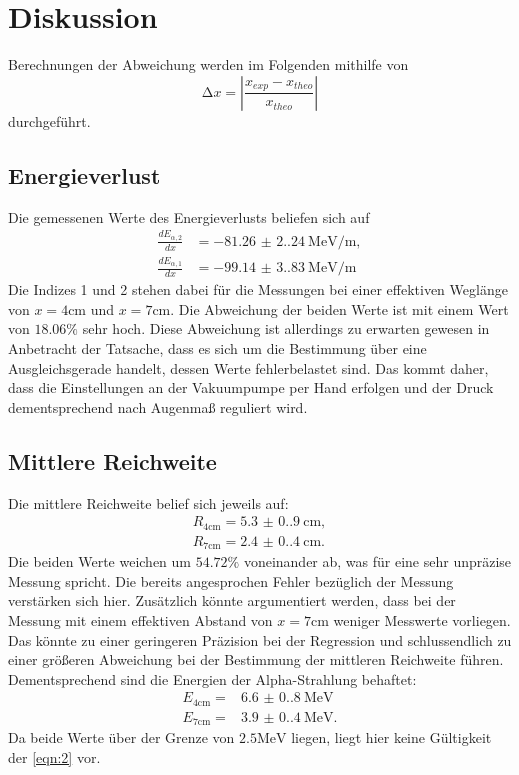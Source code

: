 \section{Diskussion}
\label{sec:Diskussion}

Berechnungen der Abweichung werden im Folgenden mithilfe von 
\begin{equation*}
    \increment x = \left| \frac{x_{exp}-x_{theo}}{x_{theo}} \right|
\end{equation*}
durchgeführt.

\subsection{Energieverlust}
Die gemessenen Werte des Energieverlusts beliefen sich auf 
\begin{align*}
    \frac{dE_{\alpha,2}}{dx} &= \qty{-81.26(2.24)}{\mega\electronvolt\per\meter}, \\
    \frac{dE_{\alpha,1}}{dx} &= \qty{-99.14(3.83)}{\mega\electronvolt\per\meter}
\end{align*}
Die Indizes 1 und 2 stehen dabei für die Messungen bei einer effektiven 
Weglänge von $x = 4 \unit{\centi\meter}$ und $x = 7 \unit{\centi\meter}$.
Die Abweichung der beiden Werte ist mit einem Wert von $18.06 \%$ sehr hoch.
Diese Abweichung ist allerdings zu erwarten gewesen in Anbetracht der Tatsache, 
dass es sich um die Bestimmung über eine Ausgleichsgerade handelt, dessen Werte 
fehlerbelastet sind. Das kommt daher, dass die Einstellungen an der Vakuumpumpe 
per Hand erfolgen und der Druck dementsprechend nach Augenmaß reguliert wird.

\subsection{Mittlere Reichweite}
Die mittlere Reichweite belief sich jeweils auf:
\begin{align}
    R_\text{4cm} = \qty{5.3(0.9)}{\centi\meter}, \\
    R_\text{7cm} = \qty{2.4(0.4)}{\centi\meter}.
\end{align}
Die beiden Werte weichen um $54.72 \%$ voneinander ab, was für eine sehr 
unpräzise Messung spricht. Die bereits angesprochen Fehler bezüglich der Messung 
verstärken sich hier. Zusätzlich könnte argumentiert werden, dass bei der 
Messung mit einem effektiven Abstand von $x = 7 \unit{\centi\meter}$ weniger
Messwerte vorliegen. Das könnte zu einer geringeren Präzision bei der Regression 
und schlussendlich zu einer größeren Abweichung bei der Bestimmung der mittleren 
Reichweite führen. Dementsprechend sind die Energien der Alpha-Strahlung 
behaftet:
\begin{align}
    E_\text{4cm} = &\qty{6.6(0.8)}{\mega\electronvolt} \\
    E_\text{7cm} = &\qty{3.9(0.4)}{\mega\electronvolt}.
\end{align}
Da beide Werte über der Grenze von $2.5 \unit{\mega\electronvolt}$ liegen, liegt 
hier keine Gültigkeit der \autoref{eqn:2} vor.

